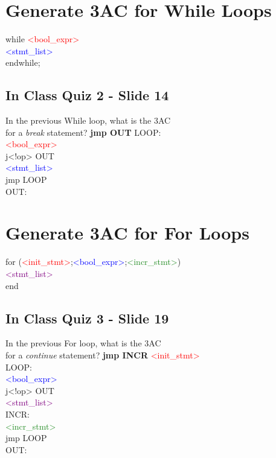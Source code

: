 \documentclass{report}
\newcommand{\textb}[1]{\textcolor{blue}{#1}}
\newcommand{\textg}[1]{\textcolor{ForestGreen}{#1}}
\newcommand{\textp}[1]{\textcolor{purple}{#1}}
\newcommand{\textr}[1]{\textcolor{red}{#1}}
\newlength\tindent
\renewcommand{\indent}{\hspace*{\tindent}}
\begin{document}
\section{Generate 3AC for While Loops}
\vspace{-1em}
\begin{multicols}{2}
while \textr{<bool\_expr>} \\
\indent \textb{<stmt\_list>} \\
endwhile;


\subsection{In Class Quiz 2 - Slide 14}
\vspace{1em}
In the previous While loop, what is the 3AC \\ 
for a \textit{break} statement? \textbf{jmp OUT}
  \vfill\columnbreak
LOOP: \\
\indent \textr{<bool\_expr>} \\
\indent j<!op> OUT \\
\indent \textb{<stmt\_list>} \\
\indent jmp LOOP \\
OUT:
\end{multicols}

\section{Generate 3AC for For Loops}
\vspace{-1em}
\begin{multicols}{2}
for (\textr{<init\_stmt>};\textb{<bool\_expr>};\textg{<incr\_stmt>}) \\
\indent \textp{<stmt\_list>} \\
end


\subsection{In Class Quiz 3 - Slide 19}
In the previous For loop, what is the 3AC \\
for a \textit{continue} statement?
\textbf{jmp INCR}
  \vfill\columnbreak
\indent \textr{<init\_stmt>} \\
LOOP: \\
\indent \textb{<bool\_expr>} \\
\indent j<!op> OUT \\
\indent \textp{<stmt\_list>} \\
INCR: \\
\indent \textg{<incr\_stmt>} \\
\indent jmp LOOP \\
OUT:
\end{multicols}
\end{document}
